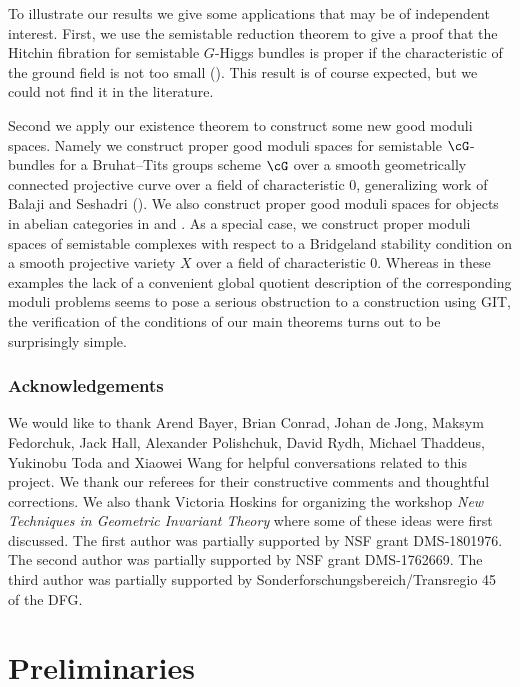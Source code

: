 \documentclass[a4paper]{amsart}
\numberwithin{equation}{section}
\theoremstyle{plain}
\theoremstyle{definition}
\begin{document}
To illustrate our results we give some applications that may be of independent interest. First, we use the semistable reduction theorem to give a proof that the Hitchin fibration for semistable $G$-Higgs bundles is proper if the characteristic of the ground field is not too small (). This result is of course expected, but we could not find it in the literature. 

Second we apply our existence theorem to construct some new good moduli spaces. Namely we construct proper good moduli spaces for semistable $\cG$-bundles for a Bruhat--Tits groups scheme $\cG$ over a smooth geometrically connected projective curve over a field of characteristic $0$, generalizing work of Balaji and Seshadri \cite{BalajiSeshadri} (). We also construct proper good moduli spaces for objects in abelian categories in  and .  As a special case, we construct proper moduli spaces of semistable complexes with respect to a Bridgeland stability condition on a smooth projective variety $X$ over a field of characteristic $0$.  Whereas in these examples the lack of a convenient global quotient description of the corresponding moduli problems seems to pose a serious obstruction to a construction using GIT, the verification of the conditions of our main theorems turns out to be surprisingly simple.

\subsubsection*{Acknowledgements}

We would like to thank Arend Bayer, Brian Conrad, Johan de Jong, Maksym Fedorchuk, Jack Hall, Alexander Polishchuk, David Rydh, Michael Thaddeus, Yukinobu Toda and Xiaowei Wang for helpful conversations related to this project. We thank our referees for their constructive comments and thoughtful corrections. We also thank Victoria Hoskins for organizing the workshop {\it New Techniques in Geometric Invariant Theory} where some of these ideas were first discussed.  The first author was partially supported by NSF grant DMS-1801976. The second author was partially supported by NSF grant DMS-1762669. The third author was partially supported by Sonderforschungsbereich/Transregio 45 of the DFG.


	


\section{Preliminaries}
\end{document}
